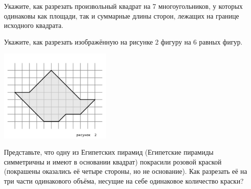 ﻿
\begin{enumerate}
\itA Укажите, как разрезать произвольный квадрат на 7 многоугольников, у которых одинаковы как площади, так и суммарные длины сторон, лежащих на границе исходного квадрата.

\itB Укажите, как разрезать изображённую на рисунке 2 фигуру на 6 равных фигур.

\centerline{\includegraphics[width=5.5cm]{stats/2018/images/figure-cuts}}

\itC Представьте, что одну из Египетских пирамид (Египетские пирамиды симметричны и имеют в основании квадрат) покрасили розовой краской (покрашены оказались её четыре стороны, но не основание). Как разрезать её на три части одинакового объёма, несущие на себе одинаковое количество краски?
\end{enumerate}